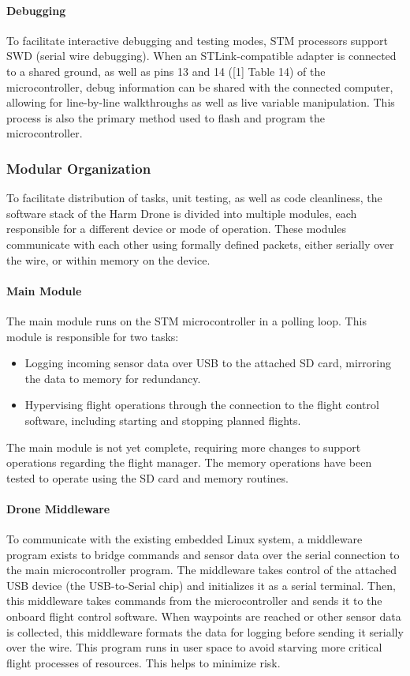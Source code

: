 \documentclass[12pt]{article}
\begin{document}
\paragraph{Debugging} To facilitate interactive debugging and testing modes, STM processors support SWD (serial wire debugging). When an STLink-compatible adapter is connected to a shared ground, as well as pins 13 and 14 ([1] Table 14) of the microcontroller, debug information can be shared with the connected computer, allowing for line-by-line walkthroughs as well as live variable manipulation. This process is also the primary method used to flash and program the microcontroller.

\subsubsection{Modular Organization}
To facilitate distribution of tasks, unit testing, as well as code cleanliness, the software stack of the Harm Drone is divided into multiple modules, each responsible for a different device or mode of operation. These modules communicate with each other using formally defined packets, either serially over the wire, or within memory on the device.

\paragraph{Main Module} The main module runs on the STM microcontroller in a polling loop. This module is responsible for two tasks:
\begin{itemize}
\item Logging incoming sensor data over USB to the attached SD card, mirroring the data to memory for redundancy.
\item Hypervising flight operations through the connection to the flight control software, including starting and stopping planned flights.
\end{itemize}
\par The main module is not yet complete, requiring more changes to support operations regarding the flight manager. The memory operations have been tested to operate using the SD card and memory routines.

\paragraph{Drone Middleware} To communicate with the existing embedded Linux system, a middleware program exists to bridge commands and sensor data over the serial connection to the main microcontroller program. The middleware takes control of the attached USB device (the USB-to-Serial chip) and initializes it as a serial terminal. Then, this middleware takes commands from the microcontroller and sends it to the onboard flight control software. When waypoints are reached or other sensor data is collected, this middleware formats the data for logging before sending it serially over the wire. This program runs in user space to avoid starving more critical flight processes of resources. This helps to minimize risk.
\end{document}
